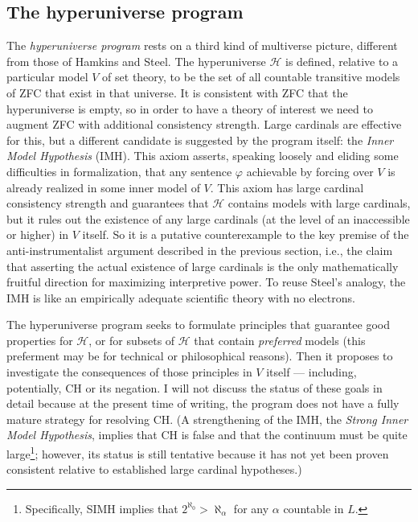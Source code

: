 \documentclass[letterpaper,12pt]{article}
\renewcommand{\phi}{\varphi}
\begin{document}
\subsection{The hyperuniverse program}
\label{hyperuniverse}
The \emph{hyperuniverse program} \citep{arrigoni2013hyperuniverse} rests on a third kind of multiverse picture, different from those of Hamkins and Steel. The hyperuniverse $\mathcal{H}$ is defined, relative to a particular model $V$ of set theory, to be the set of all countable transitive models of ZFC that exist in that universe. It is consistent with ZFC that the hyperuniverse is empty, so in order to have a theory of interest we need to augment ZFC with additional consistency strength. Large cardinals are effective for this, but a different candidate is suggested by the program itself: the \emph{Inner Model Hypothesis} (IMH). This axiom asserts, speaking loosely and eliding some difficulties in formalization, that any sentence $\phi$ achievable by forcing over $V$ is already realized in some inner model of $V$. This axiom has large cardinal consistency strength and guarantees that $\mathcal{H}$ contains models with large cardinals, but it rules out the existence of any large cardinals (at the level of an inaccessible or higher) in $V$ itself. So it is a putative counterexample to the key premise of the anti-instrumentalist argument described in the previous section, i.e., the claim that asserting the actual existence of large cardinals is the only mathematically fruitful direction for maximizing interpretive power. To reuse Steel's analogy, the IMH is like an empirically adequate scientific theory with no electrons.

The hyperuniverse program seeks to formulate principles that guarantee good properties for $\mathcal{H}$, or for subsets of $\mathcal{H}$ that contain \emph{preferred} models (this preferment may be for technical or philosophical reasons). Then it proposes to investigate the consequences of those principles in $V$ itself --- including, potentially, CH or its negation. I will not discuss the status of these goals in detail because at the present time of writing, the program does not have a fully mature strategy for resolving CH. (A strengthening of the IMH, the \emph{Strong Inner Model Hypothesis}, implies that CH is false and that the continuum must be quite large\footnote{Specifically, SIMH implies that $2^{\aleph_0} > \aleph_\alpha$ for any $\alpha$ countable in $L$.}; however, its status is still tentative because it has not yet been proven consistent relative to established large cardinal hypotheses.)
\end{document}
